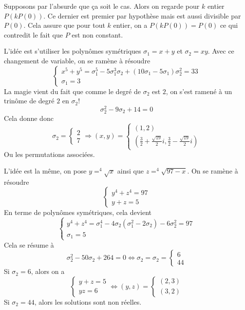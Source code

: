 \begin{sol}
Supposons par l'absurde que ça soit le cas. Alors on regarde pour $k$ entier $P(kP(0))$. Ce dernier est premier par hypothèse mais est aussi divisible par $P(0)$. Cela assure que pour tout $k$ entier, on a $P(kP(0))=P(0)$ ce qui contredit le fait que $P$ est non constant.
\end{sol}

\begin{sol}
L'idée est s'utiliser les polynômes symétriques $\sigma_1=x+y$ et $\sigma_2=xy$. Avec ce changement de variable, on se ramène à résoudre
$$\left \{
\begin{array}{rcl}
x^5+y^5=\sigma_1^5-5\sigma_1^3\sigma_2+(10\sigma_1-5\sigma_1)\sigma_2^2=33 \\
\sigma_1=3
\end{array}
\right. $$
La magie vient du fait que comme le degré de $\sigma_2$ est $2$, on s'est ramené à un trinôme de degré $2$ en $\sigma_2!$
$$\sigma_2^2-9\sigma_2+14=0 $$
Cela donne donc
$$\sigma_2=\left \{
\begin{array}{rcl}
2 \\
7
\end{array}
\right. \Rightarrow (x,y)=\left \{
\begin{array}{rcl}
(1,2) \\
\left(\frac{3}{2}+\frac{\sqrt{19}}{2}i,\frac{3}{2}-\frac{\sqrt{19}}{2}i\right)
\end{array}
\right.$$ Ou les permutations associées.
\end{sol}

\begin{sol}
L'idée est la même, on pose $y=^4\sqrt{x}$ ainsi que $z=^4\sqrt{97-x}$. On se ramène à résoudre
$$\left\{\begin{array}{rcl}
y^4+z^4=97 \\
y+z=5
\end{array}\right. $$ En terme de polynômes symétriques, cela devient $$\left\{\begin{array}{rcl}
y^4+z^4=\sigma_1^4-4\sigma_2(\sigma_1^2-2\sigma_2)-6\sigma_2^2=97 \\
\sigma_1=5
\end{array}\right. $$
Cela se résume à
$$\sigma_2^2-50\sigma_2+264=0\iff \sigma_2=\sigma_2=\left\{\begin{array}{rcl}
6 \\
44
\end{array}\right. $$
Si $\sigma_2=6$, alors on a
$$ \left\{\begin{array}{rcl}
y+z=5 \\
yz=6
\end{array}\right.\iff (y,z)= \left\{\begin{array}{rcl}
(2,3) \\
(3,2)
\end{array}\right.$$
Si $\sigma_2=44$, alors les solutions sont non réelles.
\end{sol}

